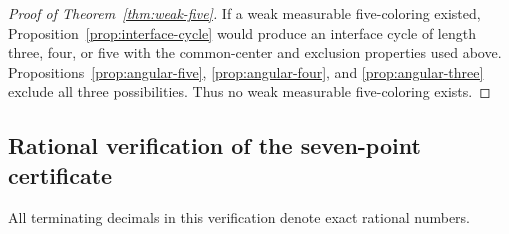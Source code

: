 \begin{proof}[Proof of Theorem~\ref{thm:weak-five}]
If a weak measurable five-coloring existed,
Proposition~\ref{prop:interface-cycle} would produce an
interface cycle of length three, four, or five with the
common-center and exclusion properties used above.
Propositions~\ref{prop:angular-five}, \ref{prop:angular-four},
and \ref{prop:angular-three} exclude all three possibilities.
Thus no weak measurable five-coloring exists.
\end{proof}

\subsection{Rational verification of the seven-point certificate}
\label{sec:angular-certificate-verification}

All terminating decimals in this verification denote exact rational
numbers.

